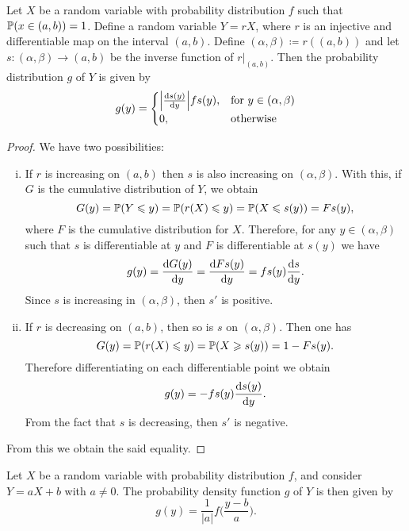 \begin{proposition}
\label{prop:injective-diff-random-variable-pdf}
Let \(X\) be a random variable with probability distribution \(f\) such that
\(\operatorname{\mathbb{P}}(x \in (a, b)) = 1\). Define a random variable \(Y = r X\), where \(r\)
is an injective and differentiable map on the interval \((a, b)\). Define
\((\alpha, \beta) \coloneq r((a, b))\) and let \(s: (\alpha, \beta) \to (a, b)\)
be the inverse function of \(r|_{(a, b)}\). Then the probability distribution
\(g\) of \(Y\) is given by
\[
g(y) =
\begin{cases}
  \Big| \frac{\mathrm{d} s(y)}{\mathrm{d} y} \Big| f s(y) ,
  &\text{for } y \in (\alpha, \beta) \\
  0, &\text{otherwise}
\end{cases}
\]
\end{proposition}

\begin{proof}
We have two possibilities:
\begin{enumerate}[(i)]\setlength\itemsep{0em}
\item If \(r\) is increasing on \((a, b)\) then \(s\) is also increasing on
  \((\alpha, \beta)\). With this, if \(G\) is the cumulative distribution of
  \(Y\), we obtain
  \[
  G(y) = \operatorname{\mathbb{P}}(Y \leqslant y)
  =  \operatorname{\mathbb{P}}(r(X) \leqslant y)
  = \operatorname{\mathbb{P}}(X \leqslant s(y))
  = F s(y),
  \]
  where \(F\) is the cumulative distribution for \(X\). Therefore, for any \(y
  \in (\alpha, \beta)\) such that \(s\) is differentiable at \(y\) and \(F\) is
  differentiable at \(s(y)\) we have
  \[
  g(y) = \frac{\mathrm{d} G(y)}{\mathrm{d} y}
  = \frac{\mathrm{d} F s(y)}{\mathrm{d} y}
  = fs(y) \frac{\mathrm{d} s}{\mathrm{d} y}.
  \]
  Since \(s\) is increasing in \((\alpha, \beta)\), then \(s'\) is positive.

\item If \(r\) is decreasing on \((a, b)\), then so is \(s\) on
  \((\alpha, \beta)\). Then one has
  \[
  G(y) = \operatorname{\mathbb{P}}(r(X) \leqslant y)
  = \operatorname{\mathbb{P}}(X \geqslant s(y))
  = 1 - F s(y).
  \]
  Therefore differentiating on each differentiable point we obtain
  \[
  g(y) = -f s(y) \frac{\mathrm{d} s(y)}{\mathrm{d} y}.
  \]
  From the fact that \(s\) is decreasing, then \(s'\) is negative.
\end{enumerate}
From this we obtain the said equality.
\end{proof}

\begin{corollary}
\label{cor:linear-fn-of-rand-var}
Let \(X\) be a random variable with probability distribution \(f\), and consider
\(Y = a X + b\) with \(a \neq 0\). The probability density function \(g\) of
\(Y\) is then given by
\[
g(y) = \frac{1}{|a|} f\Big(\frac{y - b}{a}\Big).
\]
\end{corollary}

